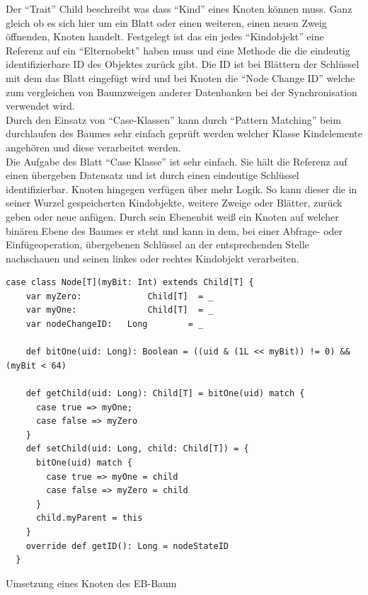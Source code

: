 \documentclass[a4paper,11pt,oneside,%
headsepline,												%
footsepline,												%
bibtotocnumbered									%
]{scrreprt}
\begin{document}
Der \enquote{Trait} Child beschreibt was dass \enquote{Kind} eines Knoten können muss. Ganz gleich ob es sich hier um ein Blatt oder einen weiteren, einen neuen Zweig öffnenden, Knoten handelt. Festgelegt ist das ein jedes \enquote{Kindobjekt} eine Referenz auf ein \enquote{Elternobekt} haben muss und eine Methode die die eindeutig identifizierbare ID des Objektes zurück gibt. Die ID ist bei Blättern der Schlüssel mit dem das Blatt eingefügt wird und bei Knoten die \enquote{Node Change ID} welche zum vergleichen von Baumzweigen anderer Datenbanken bei der Synchronisation verwendet wird.\\

Durch den Einsatz von \enquote{Case-Klassen} kann durch \enquote{Pattern Matching} beim durchlaufen des Baumes sehr einfach geprüft werden welcher Klasse Kindelemente angehören und diese verarbeitet werden.\\

Die Aufgabe des Blatt \enquote{Case Klasse} ist sehr einfach. Sie hält die Referenz auf einen übergeben Datensatz und ist durch einen eindeutige Schlüssel identifizierbar. Knoten hingegen verfügen über mehr Logik. So kann dieser die in seiner Wurzel gespeicherten Kindobjekte, weitere Zweige oder Blätter, zurück geben oder neue anfügen. Durch sein Ebenenbit weiß ein Knoten auf welcher binären Ebene des Baumes er steht und kann in dem, bei einer Abfrage- oder Einfügeoperation, übergebenen Schlüssel an der entsprechenden Stelle nachschauen und seinen linkes oder rechtes Kindobjekt verarbeiten.

\begin{listing}[H]
	\begin{verbatim}
case class Node[T](myBit: Int) extends Child[T] {
    var myZero:				Child[T]  = _
    var myOne:				Child[T]  = _
    var nodeChangeID:	Long    	= _

    def bitOne(uid: Long): Boolean = ((uid & (1L << myBit)) != 0) && (myBit < 64)

    def getChild(uid: Long): Child[T] = bitOne(uid) match {
      case true => myOne;
      case false => myZero
    }
    def setChild(uid: Long, child: Child[T]) = {
      bitOne(uid) match {
        case true => myOne = child
        case false => myZero = child
      }
      child.myParent = this
    }
    override def getID(): Long = nodeStateID
  }	
	\end{verbatim}
	\caption{Umsetzung eines Knoten des \ac{EB-Baum}}
	\label{lst:Knoten EB-Baum}
\end{listing}
\end{document}
